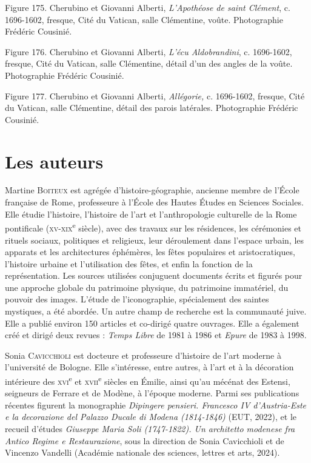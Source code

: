 \documentclass[12pt,twoside,openany]{book}
\begin{document}
Figure 175. Cherubino et Giovanni Alberti, \textit{L’Apothéose de saint Clément}, c. 1696-1602, fresque, Cité du Vatican, salle Clémentine, voûte. Photographie Frédéric Cousinié.

Figure 176. Cherubino et Giovanni Alberti, \textit{L’écu Aldobrandini}, c. 1696-1602, fresque, Cité du Vatican, salle Clémentine, détail d’un des angles de la voûte. Photographie Frédéric Cousinié.

Figure 177. Cherubino et Giovanni Alberti, \textit{Allégorie, }c. 1696-1602, fresque, Cité du Vatican, salle Clémentine, détail des parois latérales. Photographie Frédéric Cousinié.

\chapter{Les auteurs}

Martine \textsc{Boiteux} est agrégée d’histoire-géographie, ancienne membre de l’École française de Rome, professeure à l’École des Hautes Études en Sciences Sociales. Elle étudie l’histoire, l’histoire de l’art et l’anthropologie culturelle de la Rome pontificale (\textsc{xv}-\textsc{xix}\textsuperscript{e} siècle), avec des travaux sur les résidences, les cérémonies et rituels sociaux, politiques et religieux, leur déroulement dans l’espace urbain, les apparats et les architectures éphémères, les fêtes populaires et aristocratiques, l’histoire urbaine et l’utilisation des fêtes, et enfin la fonction de la représentation. Les sources utilisées conjuguent documents écrits et figurés pour une approche globale du patrimoine physique, du patrimoine immatériel, du pouvoir des images. L’étude de l’iconographie, spécialement des saintes mystiques, a été abordée. Un autre champ de recherche est la communauté juive. Elle a publié environ 150 articles et co-dirigé quatre ouvrages. Elle a également créé et dirigé deux revues : \textit{Temps Libre }de 1981 à 1986 et \textit{Epure }de 1983 à 1998.

Sonia \textsc{Cavicchioli }est docteure et professeure d’histoire de l’art moderne à l’université de Bologne. Elle s’intéresse, entre autres, à l’art et à la décoration intérieure des \textsc{xvi}\textsuperscript{e }et \textsc{xvii}\textsuperscript{e} siècles en Émilie, ainsi qu’au mécénat des Estensi, seigneurs de Ferrare et de Modène, à l’époque moderne. Parmi ses publications récentes figurent la monographie \textit{Dipingere pensieri. Francesco IV d’Austria-Este e la decorazione del Palazzo Ducale di Modena (1814-1846)} (EUT, 2022), et le recueil d’études \textit{Giuseppe Maria Soli (1747-1822). Un architetto modenese fra Antico Regime e Restaurazione}, sous la direction de Sonia Cavicchioli et de Vincenzo Vandelli (Académie nationale des sciences, lettres et arts, 2024).
\end{document}
